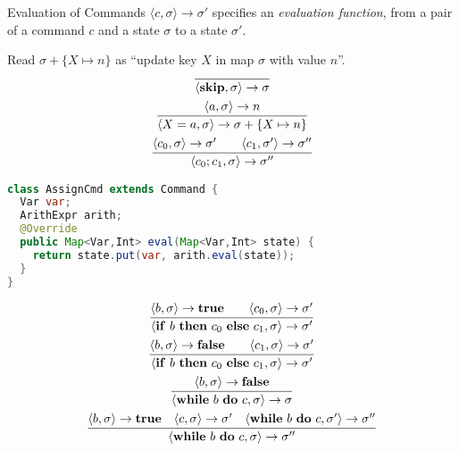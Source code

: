\begin{frame}[fragile]{Evaluation of Commands}
    $\langle c, \sigma \rangle \rightarrow \sigma'$ specifies an
    \emph{evaluation function}, from a pair of a command $c$ and a state
    $\sigma$ to a state $\sigma'$.
    \begin{overprint}
        Read $\sigma + \{X \mapsto n\}$ as ``update key $X$ in map $\sigma$ with value $n$''.
        \begin{gather*}
            \infer{\langle \mathbf{skip}, \sigma \rangle \rightarrow \sigma}{} \\
            \infer{\langle X = a , \sigma \rangle \rightarrow \sigma + \{X \mapsto n\}}{\langle a , \sigma \rangle \rightarrow n} \\
            \infer{\langle c_0; c_1 , \sigma \rangle \rightarrow \sigma''}{\langle c_0 , \sigma \rangle \rightarrow  \sigma' \qquad \langle c_1 , \sigma' \rangle \rightarrow \sigma''}
        \end{gather*}
        \begin{lstlisting}[language=java]
class AssignCmd extends Command {
  Var var;
  ArithExpr arith;
  @Override
  public Map<Var,Int> eval(Map<Var,Int> state) {
    return state.put(var, arith.eval(state));
  }
}
        \end{lstlisting}
        \begin{gather*}
            \infer{\langle \mathbf{if}\ b\ \mathbf{then}\ c_0\ \mathbf{else}\ c_1, \sigma \rangle \rightarrow \sigma'}{\langle b , \sigma \rangle \rightarrow  \mathbf{true} \qquad \langle c_0 , \sigma \rangle \rightarrow \sigma'} \\
            \infer{\langle \mathbf{if}\ b\ \mathbf{then}\ c_0\ \mathbf{else}\ c_1, \sigma \rangle \rightarrow \sigma'}{\langle b , \sigma \rangle \rightarrow  \mathbf{false} \qquad \langle c_1 , \sigma \rangle \rightarrow \sigma'} \\
            \infer{\langle \mathbf{while}\ b\ \mathbf{do}\ c, \sigma \rangle \rightarrow \sigma}{\langle b , \sigma \rangle \rightarrow  \mathbf{false} } \\
            \infer{\langle \mathbf{while}\ b\ \mathbf{do}\ c, \sigma \rangle \rightarrow \sigma''}{\langle b , \sigma \rangle \rightarrow  \mathbf{true} \quad \langle c , \sigma \rangle \rightarrow \sigma' \quad \langle \mathbf{while}\ b\ \mathbf{do}\ c, \sigma' \rangle \rightarrow \sigma''}
        \end{gather*}
    \end{overprint}
\end{frame}


